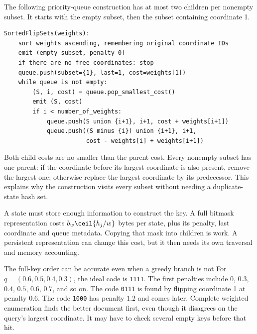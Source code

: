 The following priority-queue construction has at most two children per nonempty subset.
It starts with the empty subset, then the subset containing coordinate 1.
\par\noindent\begin{minipage}{\linewidth}
\begin{lstlisting}[caption={A complete sorted-subset stream, not one chain of flips.}]
SortedFlipSets(weights):
    sort weights ascending, remembering original coordinate IDs
    emit (empty subset, penalty 0)
    if there are no free coordinates: stop
    queue.push(subset={1}, last=1, cost=weights[1])
    while queue is not empty:
        (S, i, cost) = queue.pop_smallest_cost()
        emit (S, cost)
        if i < number_of_weights:
            queue.push(S union {i+1}, i+1, cost + weights[i+1])
            queue.push((S minus {i}) union {i+1}, i+1,
                       cost - weights[i] + weights[i+1])
\end{lstlisting}
\end{minipage}\par

Both child costs are no smaller than the parent cost. Every nonempty subset has one parent:
if the coordinate before its largest coordinate is also present, remove the largest one;
otherwise replace the largest coordinate by its predecessor. This explains why the construction
visits every subset without needing a duplicate-state hash set.

A state must store enough information to construct the key. A full bitmask representation costs
$b_w\ceil{h_j/w}$ bytes per state, plus its penalty, last coordinate and queue metadata.
Copying that mask into children is work. A persistent representation can change this cost,
but it then needs its own traversal and memory accounting.

\begin{examplebox}{The full-key order can be accurate even when a greedy branch is not}
For $q=(0.6,0.5,0.4,0.3)$, the ideal code is \texttt{1111}. The first penalties include
$0$, $0.3$, $0.4$, $0.5$, $0.6$, $0.7$, and so on. The code \texttt{0111} is found by flipping
coordinate 1 at penalty $0.6$. The code \texttt{1000} has penalty $1.2$ and comes later.
Complete weighted enumeration finds the better document first, even though it disagrees on
the query's largest coordinate. It may have to check several empty keys before that hit.
\end{examplebox}

